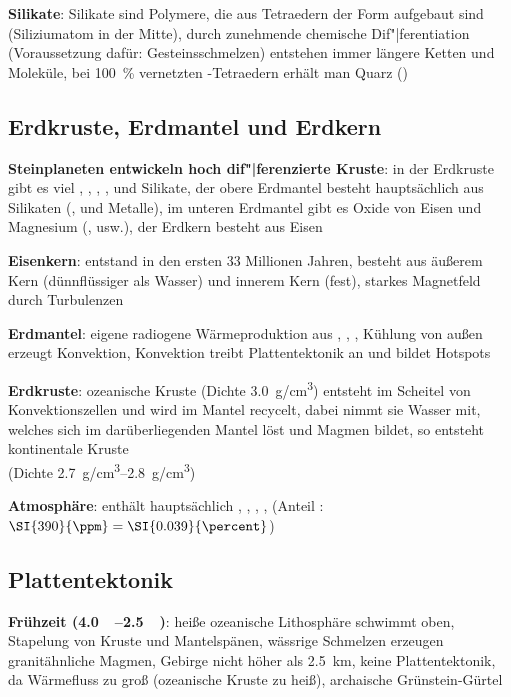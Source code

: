 \textbf{Silikate}:
Silikate sind Polymere, die aus Tetraedern der Form  aufgebaut sind
(Siliziumatom in der Mitte),
durch zunehmende chemische Dif"|ferentiation (Voraussetzung dafür: Gesteinsschmelzen)
entstehen immer längere Ketten und Moleküle,
bei \SI{100}{\percent} vernetzten -Tetraedern erhält man Quarz ()

\subsection{%
    Erdkruste, Erdmantel und Erdkern%
}

\textbf{Steinplaneten entwickeln hoch dif"|ferenzierte Kruste}:
in der Erdkruste gibt es viel , , , ,  und Silikate,
der obere Erdmantel besteht hauptsächlich aus Silikaten (,  und Metalle),
im unteren Erdmantel gibt es Oxide von Eisen und Magnesium (,  usw.),
der Erdkern besteht aus Eisen

\textbf{Eisenkern}:
entstand in den ersten 33 Millionen Jahren,
besteht aus äußerem Kern (dünnflüssiger als Wasser) und innerem Kern (fest),
starkes Magnetfeld durch Turbulenzen

\textbf{Erdmantel}:
eigene radiogene Wärmeproduktion aus , , ,
Kühlung von außen erzeugt Konvektion,
Konvektion treibt Plattentektonik an und bildet Hotspots

\textbf{Erdkruste}:
ozeanische Kruste (Dichte \SI{3.0}{\gram/\centi\meter\cubed})
entsteht im Scheitel von Konvektionszellen und wird im Mantel recycelt,
dabei nimmt sie Wasser mit, welches sich im darüberliegenden Mantel löst und Magmen bildet,
so entsteht kontinentale Kruste\\
(Dichte \SIrange{2.7}{2.8}{\gram/\centi\meter\cubed})

\textbf{Atmosphäre}:
enthält hauptsächlich , , , , 
(Anteil : $\SI{390}{\ppm} = \SI{0.039}{\percent}$)

\subsection{%
    Plattentektonik%
}

\textbf{Frühzeit (\SIrange{4.0}{2.5}{\giga\year})}:
heiße ozeanische Lithosphäre schwimmt oben,
Stapelung von Kruste und Mantelspänen,
wässrige Schmelzen erzeugen granitähnliche Magmen,
Gebirge nicht höher als \SI{2.5}{\kilo\meter},
keine Plattentektonik, da Wärmefluss zu groß (ozeanische Kruste zu heiß),
archaische Grünstein-Gürtel

